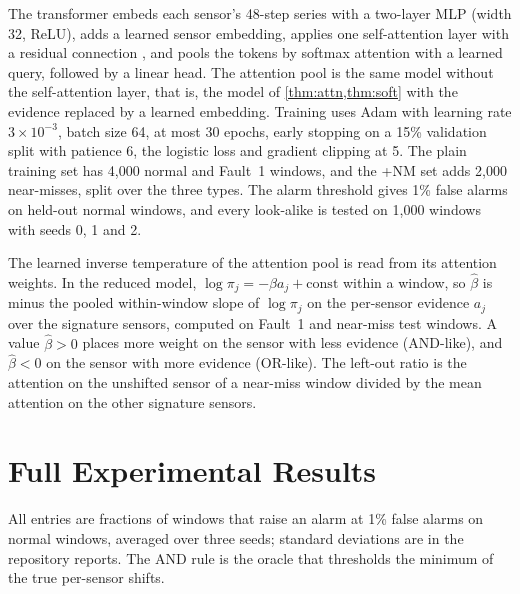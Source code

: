 The transformer embeds each sensor's 48-step series with a two-layer MLP (width 32, ReLU), adds a learned sensor embedding, applies one self-attention layer with a residual connection \citep{vaswani2017}, and pools the tokens by softmax attention with a learned query, followed by a linear head. The attention pool is the same model without the self-attention layer, that is, the model of \cref{thm:attn,thm:soft} with the evidence replaced by a learned embedding. Training uses Adam \citep{kingma2015} with learning rate $3\times10^{-3}$, batch size 64, at most 30 epochs, early stopping on a 15\% validation split with patience 6, the logistic loss and gradient clipping at 5. The plain training set has 4{,}000 normal and Fault~1 windows, and the +NM set adds 2{,}000 near-misses, split over the three types. The alarm threshold gives 1\% false alarms on held-out normal windows, and every look-alike is tested on 1{,}000 windows with seeds 0, 1 and 2.

The learned inverse temperature of the attention pool is read from its attention weights. In the reduced model, $\log\pi_j=-\beta a_j+\mathrm{const}$ within a window, so $\hat\beta$ is minus the pooled within-window slope of $\log\pi_j$ on the per-sensor evidence $a_j$ over the signature sensors, computed on Fault~1 and near-miss test windows. A value $\hat\beta>0$ places more weight on the sensor with less evidence (AND-like), and $\hat\beta<0$ on the sensor with more evidence (OR-like). The left-out ratio is the attention on the unshifted sensor of a near-miss window divided by the mean attention on the other signature sensors.

\section{Full Experimental Results}\label{app:results}

All entries are fractions of windows that raise an alarm at 1\% false alarms on normal windows, averaged over three seeds; standard deviations are in the repository reports. The AND rule is the oracle that thresholds the minimum of the true per-sensor shifts.

